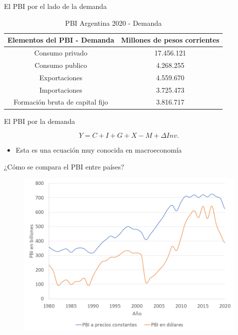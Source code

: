 \documentclass{beamer}
\begin{document}
\begin{frame}{El PBI por el lado de la demanda}
    \begin{table}[H]
\begin{tabular}{|c|c|}
\hline
\textbf{Elementos del PBI - Demanda} & \textbf{Millones de pesos corrientes} \\ \hline
Consumo privado                      & 17.456.121                            \\ \hline
Consumo publico                      & 4.268.255                             \\ \hline
Exportaciones                        & 4.559.670                             \\ \hline
Importaciones                        & 3.725.473                             \\ \hline
Formación bruta de capital fijo      & 3.816.717                             \\ \hline
\end{tabular}
\caption{PBI Argentina 2020 - Demanda}
\label{Tab:T38.2}
\end{table}

\end{frame}



\begin{frame}{El PBI por la demanda}
    
  \begin{equation}
        Y= C + I + G + X - M +  \Delta Inv.
  \end{equation}
  \begin{itemize}
  \item Esta es una ecuación muy conocida en macroeconomía
  \end{itemize}
\end{frame}

\begin{frame}{¿Cómo se compara el PBI entre países?}
    \begin{figure} [H]   \includegraphics[scale=1.04]{Figures/G3.png}
\end{figure}
\end{frame}
                   
\end{document}
